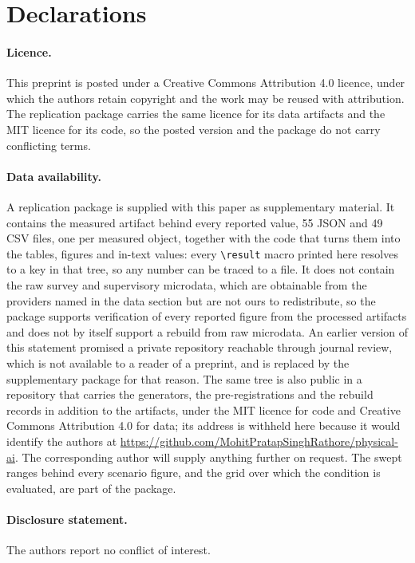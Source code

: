 \section*{Declarations}

\paragraph{Licence.} This preprint is posted under a Creative Commons Attribution 4.0
licence, under which the authors retain copyright and the work may be reused with
attribution. The replication package carries the same licence for its data artifacts and the
MIT licence for its code, so the posted version and the package do not carry conflicting
terms.

\paragraph{Data availability.} A replication package is supplied with this paper as
supplementary material. It contains the measured artifact behind every reported value, 55 JSON
and 49 CSV files, one per measured object, together with the code that turns them into the
tables, figures and in-text values: every \verb|\result| macro printed here resolves to a key
in that tree, so any number can be traced to a file. It does not contain the raw survey and
supervisory microdata, which are obtainable from the providers named in the data section but
are not ours to redistribute, so the package supports verification of every reported figure
from the processed artifacts and does not by itself support a rebuild from raw microdata. An
earlier version of this statement promised a private repository reachable through journal
review, which is not available to a reader of a preprint, and is replaced by the supplementary
package for that reason. The same tree is also public in a repository that carries the
generators, the pre-registrations and the rebuild records in addition to the artifacts, under
the MIT licence for code and Creative Commons Attribution 4.0 for data\ifanon; its address is
withheld here because it would identify the authors\else{} at
\url{https://github.com/MohitPratapSinghRathore/physical-ai}\fi. The corresponding author
will supply anything further on request. The swept ranges behind every scenario figure, and the grid over which the
condition is evaluated, are part of the package.

\ifanon
\else
\paragraph{Disclosure statement.} The authors report no conflict of interest.
